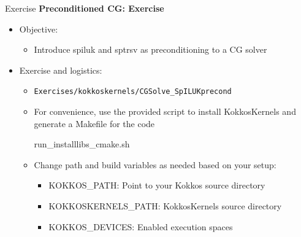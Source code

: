 \begin{frame}[fragile]{Exercise}
\textbf{Preconditioned CG: Exercise}
\begin{itemize}
  \item Objective:
  \begin{itemize}
    \item Introduce spiluk and sptrsv as preconditioning to a CG solver
  \end{itemize}

  \item Exercise and logistics:
  \begin{itemize}
    \item \verb!Exercises/kokkoskernels/CGSolve_SpILUKprecond!
    \item For convenience, use the provided script to install KokkosKernels and generate a Makefile for the code
    \begin{code}
      run_installlibs_cmake.sh
    \end{code}
    \item Change path and build variables as needed based on your setup:
    \begin{itemize}
      \item KOKKOS\_PATH: Point to your Kokkos source directory
      \item KOKKOSKERNELS\_PATH: KokkosKernels source directory
      \item KOKKOS\_DEVICES: Enabled execution spaces
    \end{itemize}
  \end{itemize}

\end{itemize}
\end{frame}

